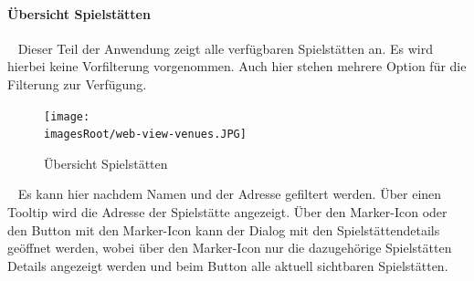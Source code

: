 \documentclass[11pt, a4paper, twoside]{article}   	%
\newcommand{\imagesRoot}{images}
\begin{document}
\paragraph{Übersicht Spielstätten}
\ \newline 
Dieser Teil der Anwendung zeigt alle verfügbaren Spielstätten an. Es wird hierbei keine Vorfilterung vorgenommen. Auch hier stehen mehrere Option für die Filterung zur Verfügung.
\begin{figure}[h]
	\centering
	\texttt{[image: \\imagesRoot/web-view-venues.JPG]}
	\caption
	{Übersicht Spielstätten}
\end{figure}
\ \newline
Es kann hier nachdem Namen und der Adresse gefiltert werden. Über einen Tooltip wird die Adresse der Spielstätte angezeigt. Über den Marker-Icon oder den Button mit den Marker-Icon kann der Dialog mit den Spielstättendetails geöffnet werden, wobei über den Marker-Icon nur die dazugehörige Spielstätten Details angezeigt werden und beim Button alle aktuell sichtbaren Spielstätten.
\newpage
\end{document}
